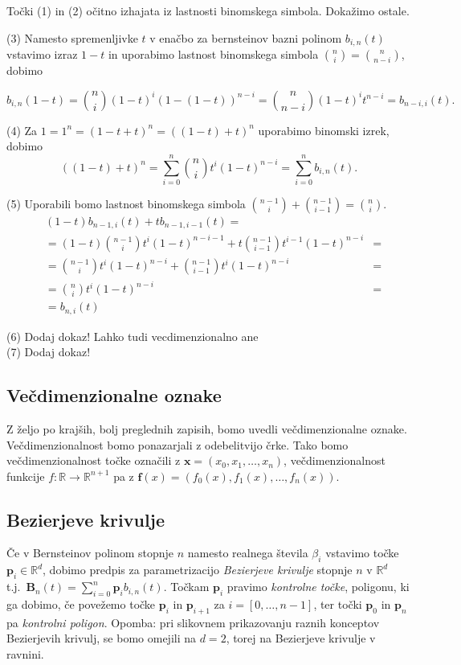 \documentclass[isrm2, tisk]{fmfdelo}
\newcommand{\R}{\mathbb R}
\newcommand{\p}{\textbf{p}}
\newcommand{\bernstein}[2]{\binom{#1}{#2}t^{#2}(1-t)^{#1-#2}}
\newcommand{\lilb}[2]{b_{#1,#2}(t)}
\newcommand{\bigbb}[1]{\textbf{B}_{#1}(t)}
\newcommand{\bernsteinsump}[2]{\sum_{#1=0}^{#2} \p_{#1}\lilb{#1}{#2}}
\begin{document}
    \begin{dokaz}
        Točki (1) in (2) očitno izhajata iz lastnosti binomskega simbola.
        Dokažimo ostale.

        \noindent(3) Namesto spremenljivke $t$ v enačbo za bernsteinov bazni polinom $\lilb{i}{n}$ vstavimo izraz $1-t$ in uporabimo lastnost binomskega simbola $\binom{n}{i} = \binom{n}{n-i}$, dobimo

        \[b_{i,n}(1-t) = \binom{n}{i}(1-t)^i(1-(1-t))^{n-i} =  \binom{n}{n-i}(1-t)^it^{n-i} = b_{n-i,i}(t).\]

        \noindent(4) Za $1 = 1^n = (1-t+t)^n = ((1-t) + t)^n$ uporabimo binomski izrek, dobimo
        \[\left((1-t) + t\right)^n = \sum_{i=0}^{n}\bernstein{n}{i} = \sum_{i=0}^n \lilb{i}{n}.\]

        \noindent(5) Uporabili bomo lastnost binomskega simbola $ \binom{n-1}{i} + \binom{n-1}{i-1} = \binom{n}{i}.$
        \begin{align}
            &(1-t)\lilb{n-1}{i} + t\lilb{n-1}{i-1} = \nonumber \\
            &= (1-t)\binom{n-1}{i}t^{i}(1-t)^{n-i-1} + t\binom{n-1}{i-1}t^{i-1}(1-t)^{n-i} &= \nonumber \\
            &= \binom{n-1}{i}t^{i}(1-t)^{n-i} + \binom{n-1}{i-1}t^{i}(1-t)^{n-i} &= \nonumber \\
            &= \binom{n}{i}t^{i}(1-t)^{n-i} &= \nonumber \\
            &= \lilb{n}{i}
        \end{align}

        \noindent(6) Dodaj dokaz!
        Lahko tudi vecdimenzionalno ane\\
        \noindent(7) Dodaj dokaz!
    \end{dokaz}

    \subsection{Večdimenzionalne oznake}
    Z željo po krajših, bolj preglednih zapisih, bomo uvedli večdimenzionalne oznake.
    Večdimenzionalnost bomo ponazarjali z odebelitvijo črke.
    Tako bomo večdimenzionalnost točke označili z $\mathbf{x}=(x_0,x_1,\dots,x_n)$, večdimenzionalnost funkcije $f:\R\to\R^{n+1}$ pa z $\mathbf{f}(x)=\left( f_0(x),f_1(x),\dots,f_n(x) \right)$.

    \subsection{Bezierjeve krivulje}
    Če v Bernsteinov polinom stopnje $n$ namesto realnega števila $\beta_i$ vstavimo točke $\p_i\in\R^d$, dobimo predpis za parametrizacijo \textit{Bezierjeve krivulje} stopnje $n$ v $\R^d$ t.j.\ $\bigbb{n}=\bernsteinsump{i}{n}$.
    Točkam $\p_i$ pravimo \textit{kontrolne točke}, poligonu, ki ga dobimo, če povežemo točke $\p_i$ in $\p_{i+1}$ za $i=[0,\dots,n-1]$, ter točki $\p_0$ in $\p_n$ pa \textit{kontrolni poligon}.
    Opomba: pri slikovnem prikazovanju raznih konceptov Bezierjevih krivulj, se bomo omejili na $d=2$, torej na Bezierjeve krivulje v ravnini.
\end{document}
